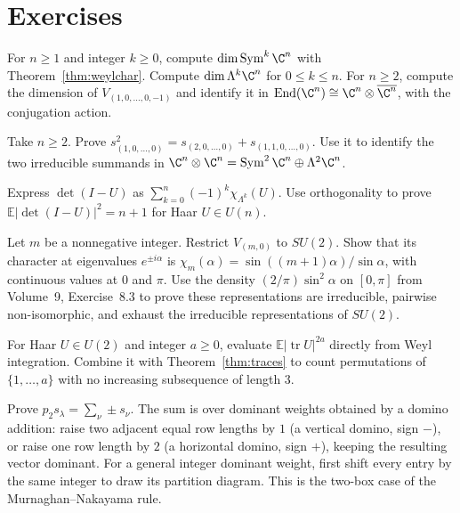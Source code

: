 \section{Exercises}

\begin{exercise}[$\star$]\label{ex:dims}
For $n\ge1$ and integer $k\ge0$, compute $\dim\operatorname{Sym}^k\C^n$ with Theorem~\ref{thm:weylchar}. Compute $\dim\Lambda^k\C^n$ for $0\le k\le n$. For $n\ge2$, compute the dimension of $V_{(1,0,\ldots,0,-1)}$ and identify it in $\operatorname{End}(\C^n)\cong\C^n\otimes\overline{\C^n}$, with the conjugation action.
\end{exercise}

\begin{exercise}[$\star$]\label{ex:tensorsquare}
Take $n\ge2$. Prove
$s_{(1,0,\ldots,0)}^2=s_{(2,0,\ldots,0)}+s_{(1,1,0,\ldots,0)}$.
Use it to identify the two irreducible summands in
$\C^n\otimes\C^n=\operatorname{Sym}^2\C^n\oplus\Lambda^2\C^n$.
\end{exercise}

\begin{exercise}[$\star\star$]\label{ex:charpoly}
Express $\det(I-U)$ as $\sum_{k=0}^n(-1)^k\chi_{\Lambda^k}(U)$. Use orthogonality to prove $\mathbb E|\det(I-U)|^2=n+1$ for Haar $U\in U(n)$.
\end{exercise}

\begin{exercise}[$\star\star$]\label{ex:su2}
Let $m$ be a nonnegative integer. Restrict $V_{(m,0)}$ to $SU(2)$. Show that its character at eigenvalues $e^{\pm i\alpha}$ is
$\chi_m(\alpha)=\sin((m+1)\alpha)/\sin\alpha$, with continuous values at $0$ and $\pi$. Use the density $(2/\pi)\sin^2\alpha$ on $[0,\pi]$ from Volume~9, Exercise~8.3 to prove these representations are irreducible, pairwise non-isomorphic, and exhaust the irreducible representations of $SU(2)$.
\end{exercise}

\begin{exercise}[$\star\star$]\label{ex:catalanu2}
For Haar $U\in U(2)$ and integer $a\ge0$, evaluate $\mathbb E|\operatorname{tr}U|^{2a}$ directly from Weyl integration. Combine it with Theorem~\ref{thm:traces} to count permutations of $\{1,\ldots,a\}$ with no increasing subsequence of length $3$.
\end{exercise}

\begin{exercise}[$\star\star\star$]\label{ex:domino}
Prove $p_2s_\lambda=\sum_\nu\pm s_\nu$. The sum is over dominant weights obtained by a domino addition: raise two adjacent equal row lengths by $1$ (a vertical domino, sign $-$), or raise one row length by $2$ (a horizontal domino, sign $+$), keeping the resulting vector dominant. For a general integer dominant weight, first shift every entry by the same integer to draw its partition diagram. This is the two-box case of the Murnaghan--Nakayama rule.
\end{exercise}

